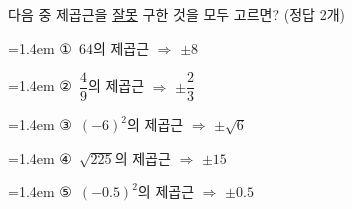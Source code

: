 다음 중 제곱근을 \underline{잘못} 구한 것을 모두 고르면? (정답 2개)
\par\medskip\par\noindent\hangindent=1.4em {\small ①}\ $64$의 제곱근 $\Rightarrow$ $\pm 8$\par\noindent\hangindent=1.4em {\small ②}\ $\dfrac{4}{9}$의 제곱근 $\Rightarrow$ $\pm\dfrac{2}{3}$\par\noindent\hangindent=1.4em {\small ③}\ $(-6)^2$의 제곱근 $\Rightarrow$ $\pm\sqrt{6}$\par\noindent\hangindent=1.4em {\small ④}\ $\sqrt{225}$의 제곱근 $\Rightarrow$ $\pm 15$\par\noindent\hangindent=1.4em {\small ⑤}\ $(-0.5)^2$의 제곱근 $\Rightarrow$ $\pm 0.5$\par\medskip
